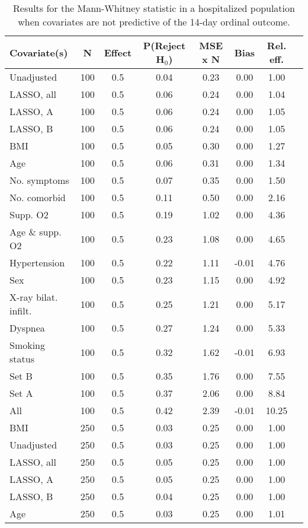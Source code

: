 \documentclass{article}
\begin{document}
{\tabcolsep=6pt  %
\begin{longtable}{lccccccc}
\caption{Results for the Mann-Whitney statistic in a hospitalized population when covariates are not predictive of the 14-day ordinal outcome.}\label{tab22}\\
Covariate(s) & N & Effect & P(Reject H$_0$) & MSE x N & Bias & Rel. eff.\\ \midrule
Unadjusted & 100 & 0.5 & 0.04 & 0.23 & 0.00 & 1.00\\
LASSO, all & 100 & 0.5 & 0.06 & 0.24 & 0.00 & 1.04\\
LASSO, A & 100 & 0.5 & 0.06 & 0.24 & 0.00 & 1.05\\
LASSO, B & 100 & 0.5 & 0.06 & 0.24 & 0.00 & 1.05\\
BMI & 100 & 0.5 & 0.05 & 0.30 & 0.00 & 1.27\\
Age & 100 & 0.5 & 0.06 & 0.31 & 0.00 & 1.34\\
No. symptoms & 100 & 0.5 & 0.07 & 0.35 & 0.00 & 1.50\\
No. comorbid & 100 & 0.5 & 0.11 & 0.50 & 0.00 & 2.16\\
Supp. O2 & 100 & 0.5 & 0.19 & 1.02 & 0.00 & 4.36\\
Age \& supp. O2 & 100 & 0.5 & 0.23 & 1.08 & 0.00 & 4.65\\
Hypertension & 100 & 0.5 & 0.22 & 1.11 & -0.01 & 4.76\\
Sex & 100 & 0.5 & 0.23 & 1.15 & 0.00 & 4.92\\
X-ray bilat. infilt. & 100 & 0.5 & 0.25 & 1.21 & 0.00 & 5.17\\
Dyspnea & 100 & 0.5 & 0.27 & 1.24 & 0.00 & 5.33\\
Smoking status & 100 & 0.5 & 0.32 & 1.62 & -0.01 & 6.93\\
Set B & 100 & 0.5 & 0.35 & 1.76 & 0.00 & 7.55\\
Set A & 100 & 0.5 & 0.37 & 2.06 & 0.00 & 8.84\\
All & 100 & 0.5 & 0.42 & 2.39 & -0.01 & 10.25\\ \midrule
BMI & 250 & 0.5 & 0.03 & 0.25 & 0.00 & 1.00\\
Unadjusted & 250 & 0.5 & 0.03 & 0.25 & 0.00 & 1.00\\
LASSO, all & 250 & 0.5 & 0.05 & 0.25 & 0.00 & 1.00\\
LASSO, A & 250 & 0.5 & 0.05 & 0.25 & 0.00 & 1.00\\
LASSO, B & 250 & 0.5 & 0.04 & 0.25 & 0.00 & 1.00\\
Age & 250 & 0.5 & 0.03 & 0.25 & 0.00 & 1.01\\

\end{longtable}}
\end{document}
